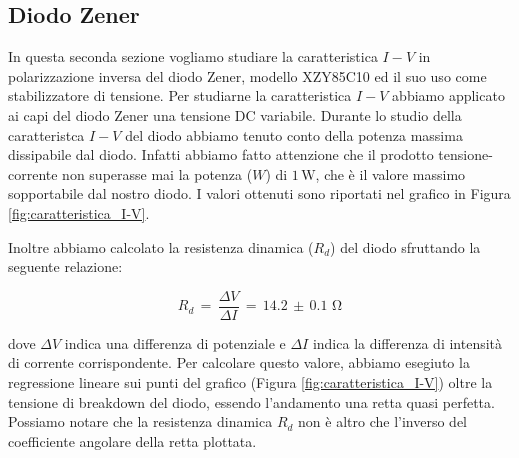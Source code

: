 \subsection*{Diodo Zener}

In questa seconda sezione vogliamo studiare la caratteristica $I-V$ in polarizzazione inversa del diodo Zener, modello XZY85C10 ed il suo uso come stabilizzatore di tensione.
Per studiarne la caratteristica $I-V$ abbiamo applicato ai capi del diodo Zener una tensione DC variabile. 
Durante lo studio della caratteristca $I-V$ del diodo abbiamo tenuto conto della potenza massima dissipabile dal diodo. Infatti abbiamo fatto attenzione che il prodotto tensione-corrente non superasse mai la potenza ($W$) di $1\,\si{\watt}$, che è il valore massimo sopportabile dal nostro diodo.
I valori ottenuti sono riportati nel grafico in Figura \ref{fig:caratteristica_I-V}.

Inoltre abbiamo calcolato la resistenza dinamica ($R_d$) del diodo sfruttando la seguente relazione:

\begin{equation}
	R_d \,=\, \frac{\Delta V}{\Delta I} \,=\, 14.2\,\pm\,0.1 \,\,\si{\ohm}
\end{equation}


dove $\Delta V$ indica una differenza di potenziale e $\Delta I$ indica la differenza di intensità di corrente corrispondente.
Per calcolare questo valore, abbiamo esegiuto la regressione lineare sui punti del grafico (Figura \ref{fig:caratteristica_I-V})
oltre la tensione di breakdown del diodo, essendo l'andamento una retta quasi perfetta. Possiamo notare che la resistenza dinamica $R_d$ non è altro che l'inverso del coefficiente angolare della retta plottata. \\

